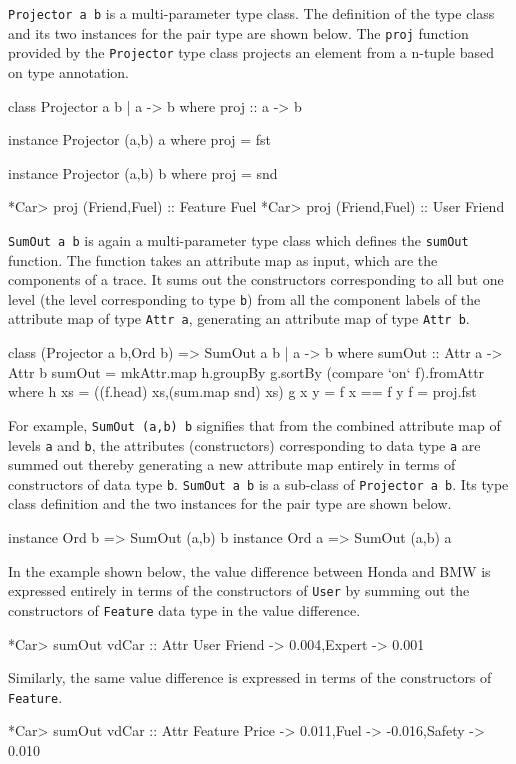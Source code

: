 \documentclass{jfp}
\newcommand{\prog}[1]{\texttt{#1}}
\begin{document}
\prog{Projector a b} is a multi-parameter type class. The definition of the type class and its two instances for the pair type are shown below. The \prog{proj} function provided by the \prog{Projector} type class projects an element from a n-tuple based on type annotation.
\begin{haskellcode}
class Projector a b | a -> b where
  proj :: a -> b 

instance Projector (a,b) a where
  proj = fst      

instance Projector (a,b) b where
  proj = snd
 
*Car> proj (Friend,Fuel) :: Feature
Fuel
*Car> proj (Friend,Fuel) :: User
Friend
\end{haskellcode}
\prog{SumOut a b} is again a multi-parameter type class which defines the \prog{sumOut} function. The function takes an attribute map as input, which are the components of a trace. It sums out the constructors corresponding to all but one level (the level corresponding to type \prog{b}) from all the component labels of the attribute map of type \prog{Attr a}, generating an attribute map of type \prog{Attr b}.
\begin{haskellcode}
class (Projector a b,Ord b) => SumOut a b | a -> b where
  sumOut :: Attr a -> Attr b 
  sumOut = mkAttr.map h.groupBy g.sortBy (compare `on` f).fromAttr
    where h xs = ((f.head) xs,(sum.map snd) xs)
          g x y = f x == f y
          f = proj.fst
\end{haskellcode}
 For example, \prog{SumOut (a,b) b} signifies that from the combined attribute map of levels \prog{a} and \prog{b}, the attributes (constructors) corresponding to data type \prog{a} are summed out thereby generating a new attribute map entirely in terms of constructors of data type \prog{b}. \prog{SumOut a b} is a sub-class of \prog{Projector a b}. Its type class definition and the two instances for the pair type are shown below. 
\begin{haskellcode}
instance Ord b => SumOut (a,b) b 
instance Ord a => SumOut (a,b) a 
\end{haskellcode}

In the example shown below, the value difference between Honda and BMW is expressed entirely in terms of the constructors of \prog{User} by summing out the constructors of \prog{Feature} data type in the value difference.
\begin{haskellcode}
*Car> sumOut vdCar :: Attr User
{Friend -> 0.004,Expert -> 0.001}
\end{haskellcode}
Similarly, the same value difference is expressed in terms of the constructors of \prog{Feature}.
\begin{haskellcode}
*Car> sumOut vdCar :: Attr Feature
{Price -> 0.011,Fuel -> -0.016,Safety -> 0.010}
\end{haskellcode}
\end{document}
